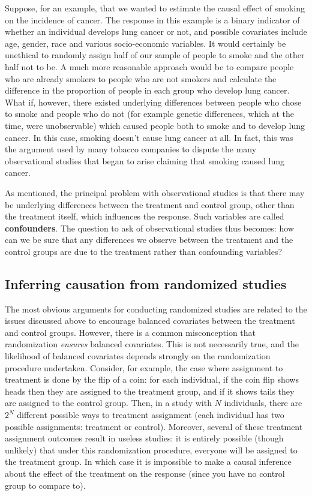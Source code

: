 Suppose, for an example, that we wanted to estimate the causal effect of smoking on the incidence of cancer. The response in this example is a binary indicator of whether an individual develops lung cancer or not, and possible covariates include age, gender, race and various socio-economic variables. It would certainly be unethical to randomly assign half of our sample of people to smoke and the other half not to be. A much more reasonable approach would be to compare people who are already smokers to people who are not smokers and calculate the difference in the proportion of people in each group who develop lung cancer. What if, however, there existed underlying differences between people who chose to smoke and people who do not (for example genetic differences, which at the time, were unobservable) which caused people both to smoke and to develop lung cancer. In this case, smoking doesn't cause lung cancer at all. In fact, this was the argument used by many tobacco companies to dispute the many observational studies that began to arise claiming that smoking caused lung cancer.

As mentioned, the principal problem with observational studies is that there may be underlying differences between the treatment and control group, other than the treatment itself, which influences the response. Such variables are called \textbf{confounders}. The question to ask of observational studies thus becomes: how can we be sure that any differences we observe between the treatment and the control groups are due to the treatment rather than confounding variables?




\subsection*{Inferring causation from randomized studies}

The most obvious arguments for conducting randomized studies are related to the issues discussed above to encourage balanced covariates between the treatment and control groups. However, there is a common misconception that randomization \emph{ensures} balanced covariates. This is not necessarily true, and the likelihood of balanced covariates depends strongly on the randomization procedure undertaken. Consider, for example, the case where assignment to treatment is done by the flip of a coin: for each individual, if the coin flip shows heads then they are assigned to the treatment group, and if it shows tails they are assigned to the control group. Then, in a study with $N$ individuals, there are $2^N$ different possible ways to treatment assignment (each individual has two possible assignments: treatment or control). Moreover, several of these treatment assignment outcomes result in useless studies: it is entirely possible (though unlikely) that under this randomization procedure, everyone will be assigned to the treatment group. In which case it is impossible to make a causal inference about the effect of the treatment on the response (since you have no control group to compare to).

